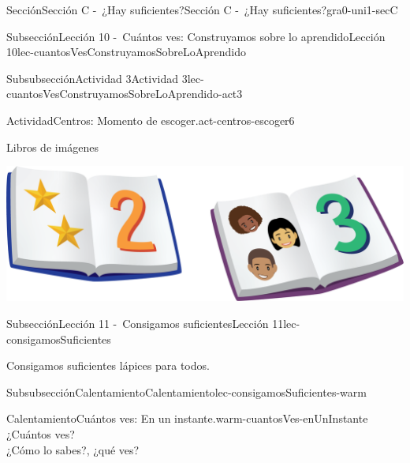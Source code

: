 \documentclass[twoside,10pt,]{article}
\begin{document}
\begin{sectionptx}{Sección}{Sección C -~¿Hay suficientes?}{}{Sección C -~¿Hay suficientes?}{}{}{gra0-uni1-secC}
\begin{subsectionptx}{Subsección}{Lección 10 -~Cuántos ves: Construyamos sobre lo aprendido}{}{Lección 10}{}{}{lec-cuantosVesConstruyamosSobreLoAprendido}
\begin{subsubsectionptx}{Subsubsección}{Actividad 3}{}{Actividad 3}{}{}{lec-cuantosVesConstruyamosSobreLoAprendido-act3}
\begin{activity}{Actividad}{Centros: Momento de escoger.}{act-centros-escoger6}
\begin{sidebyside}{2}{0.025}{0.025}{0.05}
\begin{sbspanel}{0.45}%
Libros de imágenes%
\par
\includegraphics[width=\linewidth]{external/png-source/K.1.D Beta Student Workbooks.Books.png}
\end{sbspanel}%
\end{sidebyside}%
\end{activity}%
\end{subsubsectionptx}
\end{subsectionptx}
%
%
\typeout{************************************************}
\typeout{************************************************}
%
\begin{subsectionptx}{Subsección}{Lección 11 -~Consigamos suficientes}{}{Lección 11}{}{}{lec-consigamosSuficientes}
\begin{introduction}{}%
Consigamos suficientes lápices para todos.%
\end{introduction}%
%
%
\typeout{************************************************}
\typeout{************************************************}
%
\begin{subsubsectionptx}{Subsubsección}{Calentamiento}{}{Calentamiento}{}{}{lec-consigamosSuficientes-warm}
\begin{exploration}{Calentamiento}{Cuántos ves: En un instante.}{warm-cuantosVes-enUnInstante}%
¿Cuántos ves?\\
 ¿Cómo lo sabes?, ¿qué ves?%
\begin{sidebyside}{2}{0}{0}{0}%
\begin{sbspanel}{0.5}%

\end{sbspanel}
\end{sidebyside}
\end{exploration}
\end{subsubsectionptx}
\end{subsectionptx}
\end{sectionptx}
\end{document}
